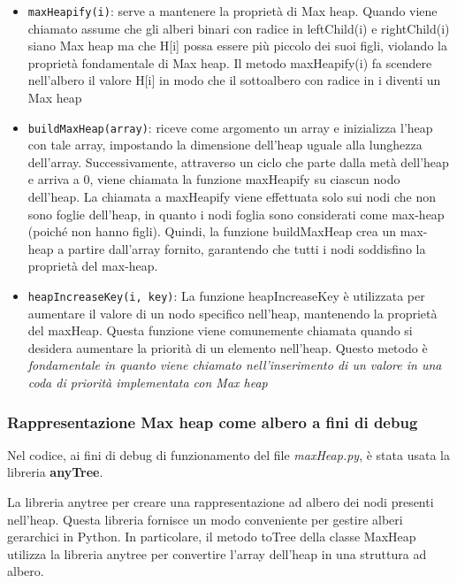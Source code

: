 \documentclass{article}
\begin{document}
\begin{itemize}
    \item \verb|maxHeapify(i)|: serve a mantenere la proprietà di Max heap. Quando viene chiamato assume che gli alberi binari con radice in leftChild(i) e rightChild(i) siano Max heap ma che H[i] possa essere più piccolo dei suoi figli, violando la proprietà fondamentale di Max heap. Il metodo maxHeapify(i) fa scendere nell'albero il valore H[i] in modo che il sottoalbero con radice in i diventi un Max heap

    \item \verb|buildMaxHeap(array)|: riceve come argomento un array e inizializza l'heap con tale array, impostando la dimensione dell'heap uguale alla lunghezza dell'array. Successivamente, attraverso un ciclo che parte dalla metà dell'heap e arriva a 0, viene chiamata la funzione maxHeapify su ciascun nodo dell'heap. La chiamata a maxHeapify viene effettuata solo sui nodi che non sono foglie dell'heap, in quanto i nodi foglia sono considerati come max-heap (poiché non hanno figli). Quindi, la funzione buildMaxHeap crea un max-heap a partire dall'array fornito, garantendo che tutti i nodi soddisfino la proprietà del max-heap.
    
    \item \verb|heapIncreaseKey(i, key)|: La funzione heapIncreaseKey è utilizzata per aumentare il valore di un nodo specifico nell'heap, mantenendo la proprietà del maxHeap. Questa funzione viene comunemente chiamata quando si desidera aumentare la priorità di un elemento nell'heap. Questo metodo è \emph{fondamentale in quanto viene chiamato nell'inserimento di un valore in una coda di priorità implementata con Max heap}
\end{itemize}

\clearpage

\subsubsection{Rappresentazione Max heap come albero a fini di debug}
Nel codice, ai fini di debug di funzionamento del file \textit{maxHeap.py}, è stata usata la libreria \textbf{anyTree}.

La libreria anytree per creare una rappresentazione ad albero dei nodi presenti nell'heap. Questa libreria fornisce un modo conveniente per gestire alberi gerarchici in Python. In particolare, il metodo toTree della classe MaxHeap utilizza la libreria anytree per convertire l'array dell'heap in una struttura ad albero.
\end{document}
